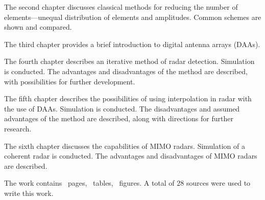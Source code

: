 The second chapter discusses classical methods for reducing the number of elements—unequal
distribution of elements and amplitudes. Common schemes are shown and compared.

The third chapter provides a brief introduction to digital antenna arrays (DAAs).

The fourth chapter describes an iterative method of radar detection. Simulation is conducted.
The advantages and disadvantages of the method are described, with possibilities for further development.

The fifth chapter describes the possibilities of using interpolation in radar with the use of DAAs.
Simulation is conducted. The disadvantages and assumed advantages of the method are described, along
with directions for further research.

The sixth chapter discusses the capabilities of MIMO radars. Simulation of a coherent radar is conducted.
The advantages and disadvantages of MIMO radars are described.

The work contains~\pageref*{LastPage} pages, \totaltables~tables, \totalfigures~figures. 
A total of 28 sources were used to write this work.

